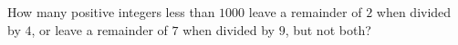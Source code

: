 How many positive integers less than $1000$ leave a remainder of $2$ when divided by $4$, or leave a remainder of $7$ when divided by $9$, but not both?
